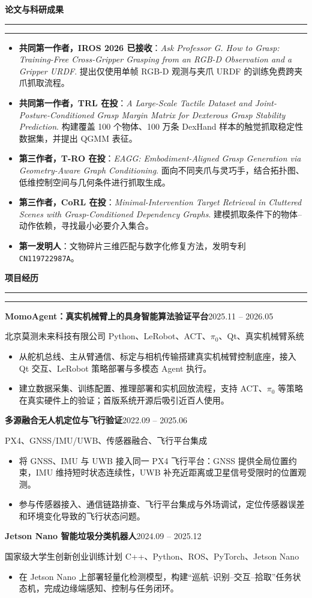 \documentclass[UTF8,a4paper,10pt,scheme=plain]{ctexart}
\newcommand{\cvsection}[1]{%
  \vspace{8pt}
  {\large\bfseries\color{Ink}#1}\par
  \vspace{2pt}
  {\color{Accent}\rule{0.72cm}{1.25pt}}{\color{Rule}\rule{\dimexpr\linewidth-0.72cm\relax}{0.45pt}}\par
  \vspace{3pt}
}
\newcommand{\cventry}[3]{%
  \vspace{3pt}
  \textbf{\color{Ink}#1}\hfill{\small\color{Muted}#2}\par
  {\small\color{Muted}#3}\par
}
\newcommand{\paperentry}[2]{%
  \item \textbf{#1}：#2
}
\begin{document}
\cvsection{论文与科研成果}
\begin{itemize}
  \paperentry{共同第一作者，IROS 2026 已接收}{\textit{Ask Professor G. How to Grasp: Training-Free Cross-Gripper Grasping from an RGB-D Observation and a Gripper URDF}. 提出仅使用单帧 RGB-D 观测与夹爪 URDF 的训练免费跨夹爪抓取流程。}
  \paperentry{共同第一作者，TRL 在投}{\textit{A Large-Scale Tactile Dataset and Joint-Posture-Conditioned Grasp Margin Matrix for Dexterous Grasp Stability Prediction}. 构建覆盖 100 个物体、100 万条 DexHand 样本的触觉抓取稳定性数据集，并提出 QGMM 表征。}
  \paperentry{第三作者，T-RO 在投}{\textit{EAGG: Embodiment-Aligned Grasp Generation via Geometry-Aware Graph Conditioning}. 面向不同夹爪与灵巧手，结合拓扑图、低维控制空间与几何条件进行抓取生成。}
  \paperentry{第三作者，CoRL 在投}{\textit{Minimal-Intervention Target Retrieval in Cluttered Scenes with Grasp-Conditioned Dependency Graphs}. 建模抓取条件下的物体--动作依赖，寻找最小必要介入集合。}
  \paperentry{第一发明人}{文物碎片三维匹配与数字化修复方法，发明专利 \texttt{CN119722987A}。}
\end{itemize}

\cvsection{项目经历}
\cventry{MomoAgent：真实机械臂上的具身智能算法验证平台}{2025.11 -- 2026.05}{北京莫测未来科技有限公司 \quad Python、LeRobot、ACT、$\pi_0$、Qt、真实机械臂系统}
\begin{itemize}
  \item 从舵机总线、主从臂通信、标定与相机传输搭建真实机械臂控制底座，接入 Qt 交互、LeRobot 策略部署与多模态 Agent 执行。
  \item 建立数据采集、训练配置、推理部署和实机回放流程，支持 ACT、$\pi_0$ 等策略在真实硬件上的验证；首版系统开源后吸引近百人使用。
\end{itemize}

\cventry{多源融合无人机定位与飞行验证}{2022.09 -- 2025.06}{PX4、GNSS/IMU/UWB、传感器融合、飞行平台集成}
\begin{itemize}
  \item 将 GNSS、IMU 与 UWB 接入同一 PX4 飞行平台：GNSS 提供全局位置约束，IMU 维持短时状态连续性，UWB 补充近距离或卫星信号受限时的位置观测。
  \item 参与传感器接入、通信链路排查、飞行平台集成与外场调试，定位传感器误差和环境变化导致的飞行状态问题。
\end{itemize}

\cventry{Jetson Nano 智能垃圾分类机器人}{2024.09 -- 2025.12}{国家级大学生创新创业训练计划 \quad C++、Python、ROS、PyTorch、Jetson Nano}
\begin{itemize}
  \item 在 Jetson Nano 上部署轻量化检测模型，构建“巡航--识别--交互--拾取”任务状态机，完成边缘端感知、控制与任务闭环。
\end{itemize}
\end{document}
